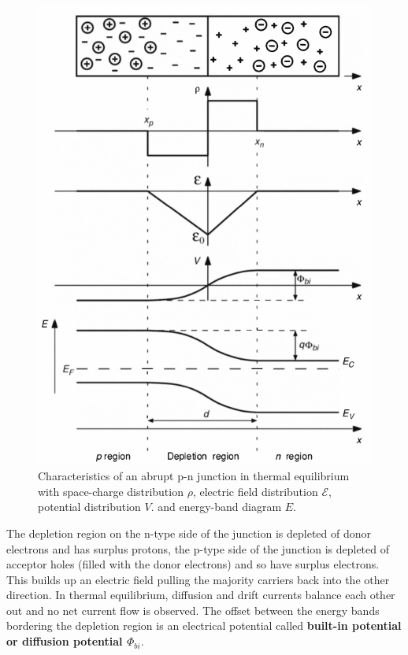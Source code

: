 \documentclass[main]{subfiles}
\begin{document}
\begin{figure}[H]
\centering
\includegraphics[scale=0.4]{pics/depletion_region.png}
\caption{Characteristics of an abrupt p-n junction in thermal equilibrium with space-charge distribution \(\rho\), electric field distribution \(\mathcal{E}\), potential distribution \(V\). and energy-band diagram \(E\).}
\end{figure}

The depletion region on the n-type side of the junction is depleted of donor electrons and has surplus protons, the p-type side of the junction is depleted of acceptor holes (filled with the donor electrons) and so have surplus electrons. This builds up an electric field pulling the majority carriers back into the other direction. In thermal equilibrium, diffusion and drift currents balance each other out and no net current flow is observed. The offset between the energy bands bordering the depletion region is an electrical potential called \textbf{built-in potential or diffusion potential \(\Phi_{bi}\)}.
\end{document}
